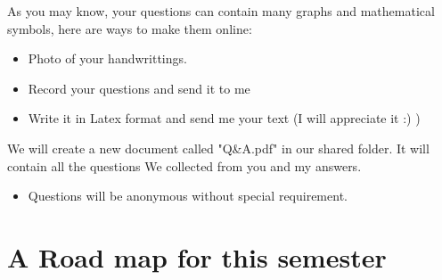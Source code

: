 \documentclass{article}
\begin{document}
\bigskip

As you may know, your questions can contain many graphs and mathematical symbols, here are ways to make them online:

\begin{itemize}
\item Photo of your handwrittings.
\item Record your questions and send it to me
\item Write it in Latex format and send me your text (I will appreciate it :) )
\end{itemize}

\bigskip

We will create a new document called "Q\&A.pdf" in our shared folder. It will contain all the questions
We collected from you and my answers.
\begin{itemize}
\item Questions will be anonymous without special requirement.
\end{itemize}

\newpage

\section*{A Road map for this semester}

\bigskip

\bigskip


\usetikzlibrary{arrows,shapes,positioning,shadows,trees}
\end{document}
